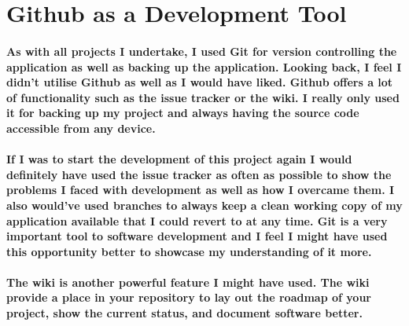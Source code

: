 \section{Github as a Development Tool}
\paragraph{As with all projects I undertake, I used Git for version controlling the application as well as backing up the application. Looking back, I feel I didn't utilise Github as well as I would have liked. Github offers a lot of functionality such as the issue tracker or the wiki. I really only used it for backing up my project and always having the source code accessible from any device.}
\paragraph{If I was to start the development of this project again I would definitely have used the issue tracker as often as possible to show the problems I faced with development as well as how I overcame them. I also would've used branches to always keep a clean working copy of my application available that I could revert to at any time. Git is a very important tool to software development and I feel I might have used this opportunity better to showcase my understanding of it more.}
\paragraph{The wiki is another powerful feature I might have used. The wiki provide a place in your repository to lay out the roadmap of your project, show the current status, and document software better.}
